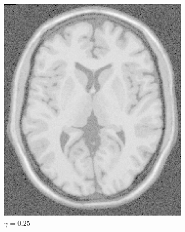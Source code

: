 \documentclass[letterpaper,12pt]{article}
\theoremstyle{plain}
\begin{document}
\begin{figure}[h]
    \centering
         \begin{subfigure}[h]{0.32\linewidth}
            \centering
            \includegraphics[width=\textwidth]{Figuras/ImageA_exp_gamma=0.25.png}
            \caption{$\gamma = 0.25$} 
         \end{subfigure}
         \begin{subfigure}[h]{0.32\linewidth}
            \centering

\end{subfigure}
\end{figure}
\end{document}
